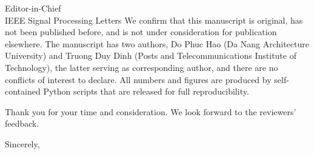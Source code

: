 \documentclass[11pt]{letter}
\begin{document}
\begin{letter}{Editor-in-Chief\\ IEEE Signal Processing Letters}
We confirm that this manuscript is original, has not been published before, and is
not under consideration for publication elsewhere. The manuscript has two authors,
Do Phuc Hao (Da Nang Architecture University) and Truong Duy Dinh (Posts and
Telecommunications Institute of Technology), the latter serving as corresponding
author, and there are no conflicts of interest to declare. All numbers and figures
are produced by self-contained Python scripts that are released for full
reproducibility.

Thank you for your time and consideration. We look forward to the reviewers'
feedback.

\closing{Sincerely,}

\end{letter}
\end{document}
